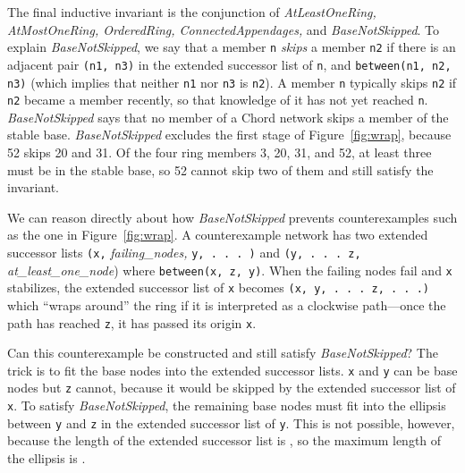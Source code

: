 \documentclass[conference]{IEEEtran}
\begin{document}
The final inductive invariant is the conjunction of 
{\it AtLeastOneRing, AtMostOneRing, OrderedRing, ConnectedAppendages,}
and {\it BaseNotSkipped}.
To explain {\it BaseNotSkipped},
we say that a member
\small
{\tt n}
\normalsize
{\it skips} a member
\small
{\tt n2}
\normalsize
if there is an adjacent pair 
\small
{\tt (n1, n3)}
\normalsize
in the extended successor list of
\small
{\tt n},
\normalsize
and
\small
{\tt between(n1, n2, n3)}
\normalsize
(which implies that neither
\small
{\tt n1}
\normalsize
nor
\small
{\tt n3}
\normalsize
is
\small
{\tt n2}).
\normalsize
A member
\small
{\tt n}
\normalsize
typically skips
\small
{\tt n2}
\normalsize
if
\small
{\tt n2}
\normalsize
became a
member recently, so that knowledge of it has not yet reached 
\small
{\tt n}.
\normalsize
{\it BaseNotSkipped} says that no member
of a Chord network skips a member of the stable base.
{\it BaseNotSkipped} excludes the first stage of Figure~\ref{fig:wrap},
because 52 skips 20 and 31.
Of the four ring members 3, 20, 31, and 52, at least three must be in
the stable base, so 52 cannot skip two of them and still satisfy
the invariant.

We can reason directly about how {\it BaseNotSkipped} prevents
counterexamples such as the one in Figure~\ref{fig:wrap}.
A counterexample network has two extended successor lists
\small
{\tt (x,} 
\normalsize
{\it failing\_nodes,}
\small
{\tt y, . . . )}
\normalsize
and 
\small
{\tt (y, . . . z,}
\normalsize
{\it at\_least\_one\_node})
where 
\small
{\tt between(x, z, y)}.
\normalsize
When the failing nodes fail and 
\small
{\tt x}
\normalsize
stabilizes, the extended successor list of 
\small
{\tt x}
\normalsize
becomes 
\small
{\tt (x, y, . . . z, . . .)}
\normalsize
which ``wraps around'' the ring if it is interpreted as a clockwise
path---once the path has reached 
\small
{\tt z},
\normalsize
it has passed its origin 
\small
{\tt x}.
\normalsize

Can this counterexample be constructed and still satisfy 
{\it BaseNotSkipped}?
The trick is to fit the  base nodes into the extended successor
lists.
\small
{\tt x}
\normalsize
and
\small
{\tt y}
\normalsize
can be base nodes but
\small
{\tt z}
\normalsize
cannot, because it would be skipped by the extended successor list of
\small
{\tt x}.
\normalsize
To satisfy {\it BaseNotSkipped}, the remaining  base nodes
must fit into the ellipsis between 
\small
{\tt y} 
\normalsize
and
\small
{\tt z}
\normalsize
in the extended successor list of
\small
{\tt y}.
\normalsize
This is not possible, however, because the length of the extended
successor list is , so the maximum length of the ellipsis is
.
\end{document}
